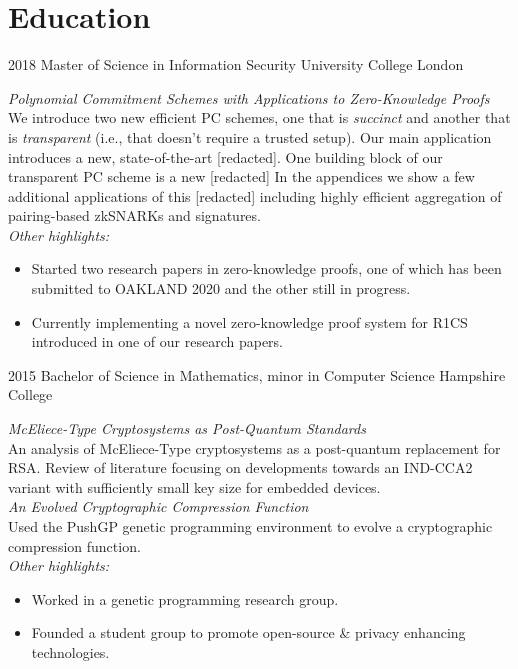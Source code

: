 \documentclass[]{fowlslegs-cv}
\newcommand\makeIcon[1]{%
    \raisebox{-1pt}{%
        \texttt{[image: icons/\#1]}%
    }%
}
\begin{document}
\section{Education}
\begin{entrylist}
\entry
{2018}
{Master of Science {\normalfont\footnotesize in Information Security}}
{}
{University College London}
{\emph{Polynomial Commitment Schemes with Applications to Zero-Knowledge
Proofs}\\
  We introduce two new efficient PC schemes, one that is \emph{succinct} and another that is \emph{transparent} (i.e., that doesn't require a trusted setup). Our main application introduces a new, state-of-the-art [redacted].
  One building block of our transparent PC scheme is a new [redacted]
  In the appendices we show a few additional applications of this [redacted]
  including highly efficient aggregation of pairing-based zkSNARKs and signatures. \vspace{1mm}\\
  \emph{Other highlights:}
  \begin{itemize}
    \item Started two research papers in zero-knowledge proofs, one of which has been submitted to OAKLAND 2020 and the other still in progress.
    \item Currently implementing a novel zero-knowledge proof system for R1CS introduced in one of our research papers.
  \end{itemize}
}
\entry
{2015}
{\makeIcon{diploma} Bachelor of Science {\normalfont\footnotesize in Mathematics, minor in Computer Science}}
{}
{Hampshire College}
{\emph{McEliece-Type Cryptosystems as Post-Quantum Standards}\\
  An analysis of McEliece-Type cryptosystems as a post-quantum replacement for
  RSA. Review of literature focusing on developments towards an IND-CCA2 variant
  with sufficiently small key size for embedded devices. \vspace{1mm}\\
  \emph{An Evolved Cryptographic Compression Function}\\
  Used the PushGP genetic programming environment to evolve a cryptographic
  compression function. \vspace{1mm}\\
  \emph{Other highlights:}
  \begin{itemize}
    \item Worked in a genetic programming research group.
    \item Founded a student group to promote open-source \& privacy enhancing technologies.
\end{itemize}}
\end{entrylist}
\end{document}
